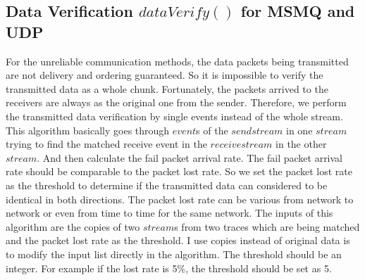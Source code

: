\subsection{Data Verification $dataVerify()$ for MSMQ and UDP}
For the unreliable communication methods, the data packets being transmitted are not delivery and ordering guaranteed. So it is impossible to verify the transmitted data as a whole chunk. Fortunately, the packets arrived to the receivers are always as the original one from the sender. Therefore, we perform the transmitted data verification by single events instead of the whole stream. This algorithm basically goes through $event$s of the $sendstream$ in one $stream$ trying to find the matched receive event in the $receivestream$ in the other $stream$. And then calculate the fail packet arrival rate. The fail packet arrival rate should be comparable to the packet lost rate. So we set the packet lost rate as the threshold to determine if the transmitted data can considered to be identical in both directions. The packet lost rate can be various from network to network or even from time to time for the same network. The inputs of this algorithm are the copies of two $stream$s from two traces which are being matched and the packet lost rate as the threshold. I use copies instead of original data is to modify the input list directly in the algorithm. The threshold should be an integer. For example if the lost rate is 5\%, the threshold should be set as 5. 

